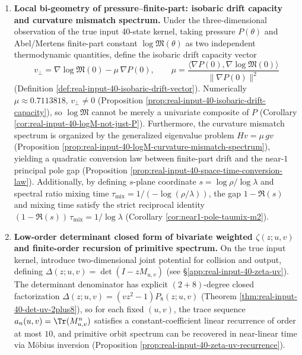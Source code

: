 \begin{enumerate}
  \item \textbf{Local bi-geometry of pressure--finite-part: isobaric drift capacity and curvature mismatch spectrum.}
  Under the three-dimensional observation of the true input 40-state kernel, taking pressure \(P(\theta)\) and Abel/Mertens finite-part constant \(\log\mathfrak{M}(\theta)\) as two independent thermodynamic quantities, define the isobaric drift capacity vector
  \[
  v_\perp=\nabla\log\mathfrak{M}(0)-\mu\,\nabla P(0),\qquad
  \mu=\frac{\langle\nabla P(0),\nabla\log\mathfrak{M}(0)\rangle}{\|\nabla P(0)\|^2}
  \]
  (Definition \ref{def:real-input-40-isobaric-drift-vector}).
  Numerically \(\mu\approx 0.7113818\), \(v_\perp\neq 0\) (Proposition \ref{prop:real-input-40-isobaric-drift-capacity}), so \(\log\mathfrak{M}\) cannot be merely a univariate composite of \(P\) (Corollary \ref{cor:real-input-40-logM-not-just-P}).
  Furthermore, the curvature mismatch spectrum is organized by the generalized eigenvalue problem \(Hv=\mu\,gv\) (Proposition \ref{prop:real-input-40-logM-curvature-mismatch-spectrum}), yielding a quadratic conversion law between finite-part drift and the near-\(1\) principal pole gap (Proposition \ref{prop:real-input-40-space-time-conversion-law}).
  Additionally, by defining \(s\)-plane coordinate \(s=\log\rho/\log\lambda\) and spectral ratio mixing time \(\tau_{\mathrm{mix}}=1/(-\log(\rho/\lambda))\), the gap \(1-\Re(s)\) and mixing time satisfy the strict reciprocal identity \((1-\Re(s))\,\tau_{\mathrm{mix}}=1/\log\lambda\) (Corollary \ref{cor:near1-pole-taumix-m2}).

  \item \textbf{Low-order determinant closed form of bivariate weighted \texorpdfstring{$\zeta(z;u,v)$}{zeta(z;u,v)} and finite-order recursion of primitive spectrum.}
  On the true input kernel, introduce two-dimensional joint potential for collision and output, defining \(\Delta(z;u,v)=\det(I-zM_{u,v})\) (see \S\ref{app:real-input-40-zeta-uv}).
  The determinant denominator has explicit \((2+8)\)-degree closed factorization \(\Delta(z;u,v)=(vz^2-1)P_8(z;u,v)\) (Theorem \ref{thm:real-input-40-det-uv-2plus8}), so for each fixed \((u,v)\), the trace sequence \(a_n(u,v)=\Tr(M_{u,v}^n)\) satisfies a constant-coefficient linear recurrence of order at most \(10\), and primitive orbit spectrum can be recovered in near-linear time via M\"obius inversion (Proposition \ref{prop:real-input-40-zeta-uv-recurrence}).


\end{enumerate}
